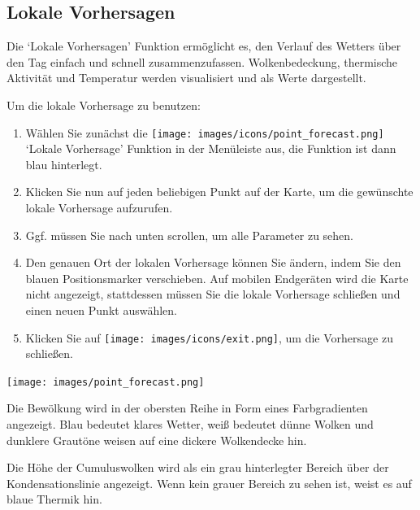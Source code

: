 \documentclass[11pt,a4paper]{article}
\begin{document}
\subsection{Lokale Vorhersagen}
Die `Lokale Vorhersagen' Funktion ermöglicht es, den Verlauf des Wetters über den Tag einfach und schnell zusammenzufassen. Wolkenbedeckung, thermische Aktivität und Temperatur werden visualisiert und als Werte dargestellt.

Um die lokale Vorhersage zu benutzen:
\begin{enumerate}
\item Wählen Sie zunächst die \texttt{[image: images/icons/point\_forecast.png]} `Lokale Vorhersage' Funktion in der Menüleiste aus, die Funktion ist dann blau hinterlegt.
\item Klicken Sie nun auf jeden beliebigen Punkt auf der Karte, um die gewünschte lokale Vorhersage aufzurufen.
\item Ggf. müssen Sie nach unten scrollen, um alle Parameter zu sehen.
\item Den genauen Ort der lokalen Vorhersage können Sie ändern, indem Sie den blauen Positionsmarker verschieben. Auf mobilen Endgeräten wird die Karte nicht angezeigt, stattdessen müssen Sie die lokale Vorhersage schließen und einen neuen Punkt auswählen.
\item Klicken Sie auf \texttt{[image: images/icons/exit.png]}, um die Vorhersage zu schließen.
\end{enumerate}
\begin{center}
\texttt{[image: images/point\_forecast.png]}
\end{center}
Die Bewölkung wird in der obersten Reihe in Form eines Farbgradienten angezeigt. Blau bedeutet klares Wetter, weiß bedeutet dünne Wolken und dunklere Grautöne weisen auf eine dickere Wolkendecke hin.

Die Höhe der Cumuluswolken wird als ein grau hinterlegter Bereich über der Kondensationslinie angezeigt. Wenn kein grauer Bereich zu sehen ist, weist es auf blaue Thermik hin.
\end{document}
